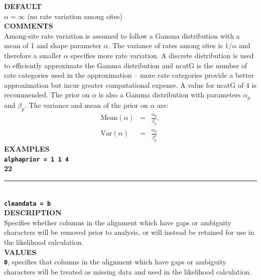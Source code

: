 \documentclass[a4paper]{book}
\numberwithin{equation}{section} \renewcommand{\baselinestretch}{0.55}
\begin{document}
\textbf{DEFAULT} \vspace{5pt}\\
$\alpha=\infty$ (no rate variation among sites) \vspace{5pt}\\
\textbf{COMMENTS} \vspace{5pt}\\
Among-site rate variation is assumed to follow a Gamma distribution
with a mean of 1 and shape parameter $\alpha$. The variance of rates
among sites is $1/\alpha$ and therefore a smaller $\alpha$ specifies
more rate variation.  A discrete distribution is used to efficiently
approximate the Gamma distribution and ncatG is the number of rate
categories used in the approximation -- more rate categories provide a
better approximation but incur greater computational expense. A value
for ncatG of 4 is recommended. The prior on $\alpha$ is also a Gamma
distribution with parameters $\alpha_p$ and $\beta_p$.  The variance
and mean of the prior on $\alpha$ are:
\begin{eqnarray}
  \textrm{Mean}(\alpha) & = & \frac{\alpha_p}{\beta_p}, \nonumber \\
  \textrm{Var}(\alpha) & = & \frac{\alpha_p}{\beta_p^2} \nonumber
\end{eqnarray}
\textbf{EXAMPLES} \vspace{5pt}\\
\textbf{\texttt{alphaprior = 1 1 4}} \vspace{10pt}\\
\textbf{{\large 22}} \\
\noindent\rule{\textwidth}{0.8pt} \\
\textbf{{\Large \texttt{cleandata = b}}} \vspace{5pt}\\
\textbf{DESCRIPTION} \vspace{5pt}\\
Specifies whether columns in the alignment which have gaps or
ambiguity characters will be removed prior to analysis, or will
instead be retained for use in the likelihood calculation.
\vspace{5pt}\\
\textbf{VALUES} \vspace{5pt}\\
\textbf{\texttt{0}}, specifies that columns in the alignment which
have gaps or ambiguity
characters will be treated as missing data and used in the likelihood calculation. \vspace{5pt}\\
\end{document}
